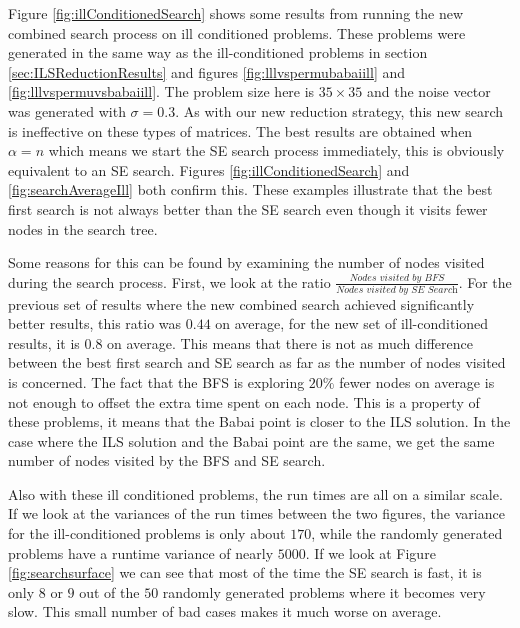 \documentclass[12pt,Bold,letterpaper]{mcgilletdclass}
\begin{document}
Figure \ref{fig:illConditionedSearch} shows some results from running the new combined search process on ill conditioned problems. These problems were generated in the same way as the ill-conditioned problems in section \ref{sec:ILSReductionResults} and figures \ref{fig:lllvspermubabaiill} and \ref{fig:lllvspermuvsbabaiill}. The problem size here is $35 \times 35$ and the noise vector was generated with $\sigma = 0.3$. As with our new reduction strategy, this new search is ineffective on these types of matrices. The best results are obtained when $\alpha = n$ which means we start the SE search process immediately, this is obviously equivalent to an SE search. Figures \ref{fig:illConditionedSearch} and \ref{fig:searchAverageIll} both confirm this. These examples illustrate that the best first search is not always better than the SE search even though it visits fewer nodes in the search tree.

Some reasons for this can be found by examining the number of nodes visited during the search process. First, we look at the ratio $\frac{\textit{Nodes visited by BFS}}{\textit{Nodes visited by SE Search}}$. For the previous set of results where the new combined search achieved significantly better results, this ratio was $0.44$ on average, for the new set of ill-conditioned results, it is $0.8$ on average. This means that there is not as much difference between the best first search and SE search as far as the number of nodes visited is concerned. The fact that the BFS is exploring $20\%$ fewer nodes on average is not enough to offset the extra time spent on each node. This is a property of these problems, it means that the Babai point is closer to the ILS solution. In the case where the ILS solution and the Babai point are the same, we get the same number of nodes visited by the BFS and SE search.

Also with these ill conditioned problems, the run times are all on a similar scale. If we look at the variances of the run times between the two figures, the variance for the ill-conditioned problems is only about $170$, while the randomly generated problems have a runtime variance of nearly $5000$. If we look at Figure \ref{fig:searchsurface} we can see that most of the time the SE search is fast, it is only $8$ or $9$ out of the $50$ randomly generated problems where it becomes very slow. This small number of bad cases makes it much worse on average.
 
\end{document}
